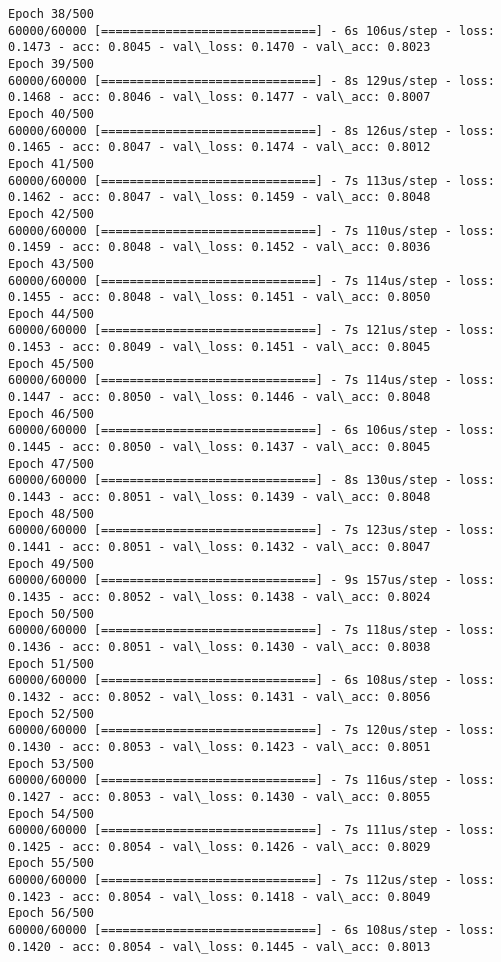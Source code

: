 \documentclass[11pt]{article}
\begin{document}
\begin{Verbatim}[commandchars=\\\{\}]
Epoch 38/500
60000/60000 [==============================] - 6s 106us/step - loss: 0.1473 - acc: 0.8045 - val\_loss: 0.1470 - val\_acc: 0.8023
Epoch 39/500
60000/60000 [==============================] - 8s 129us/step - loss: 0.1468 - acc: 0.8046 - val\_loss: 0.1477 - val\_acc: 0.8007
Epoch 40/500
60000/60000 [==============================] - 8s 126us/step - loss: 0.1465 - acc: 0.8047 - val\_loss: 0.1474 - val\_acc: 0.8012
Epoch 41/500
60000/60000 [==============================] - 7s 113us/step - loss: 0.1462 - acc: 0.8047 - val\_loss: 0.1459 - val\_acc: 0.8048
Epoch 42/500
60000/60000 [==============================] - 7s 110us/step - loss: 0.1459 - acc: 0.8048 - val\_loss: 0.1452 - val\_acc: 0.8036
Epoch 43/500
60000/60000 [==============================] - 7s 114us/step - loss: 0.1455 - acc: 0.8048 - val\_loss: 0.1451 - val\_acc: 0.8050
Epoch 44/500
60000/60000 [==============================] - 7s 121us/step - loss: 0.1453 - acc: 0.8049 - val\_loss: 0.1451 - val\_acc: 0.8045
Epoch 45/500
60000/60000 [==============================] - 7s 114us/step - loss: 0.1447 - acc: 0.8050 - val\_loss: 0.1446 - val\_acc: 0.8048
Epoch 46/500
60000/60000 [==============================] - 6s 106us/step - loss: 0.1445 - acc: 0.8050 - val\_loss: 0.1437 - val\_acc: 0.8045
Epoch 47/500
60000/60000 [==============================] - 8s 130us/step - loss: 0.1443 - acc: 0.8051 - val\_loss: 0.1439 - val\_acc: 0.8048
Epoch 48/500
60000/60000 [==============================] - 7s 123us/step - loss: 0.1441 - acc: 0.8051 - val\_loss: 0.1432 - val\_acc: 0.8047
Epoch 49/500
60000/60000 [==============================] - 9s 157us/step - loss: 0.1435 - acc: 0.8052 - val\_loss: 0.1438 - val\_acc: 0.8024
Epoch 50/500
60000/60000 [==============================] - 7s 118us/step - loss: 0.1436 - acc: 0.8051 - val\_loss: 0.1430 - val\_acc: 0.8038
Epoch 51/500
60000/60000 [==============================] - 6s 108us/step - loss: 0.1432 - acc: 0.8052 - val\_loss: 0.1431 - val\_acc: 0.8056
Epoch 52/500
60000/60000 [==============================] - 7s 120us/step - loss: 0.1430 - acc: 0.8053 - val\_loss: 0.1423 - val\_acc: 0.8051
Epoch 53/500
60000/60000 [==============================] - 7s 116us/step - loss: 0.1427 - acc: 0.8053 - val\_loss: 0.1430 - val\_acc: 0.8055
Epoch 54/500
60000/60000 [==============================] - 7s 111us/step - loss: 0.1425 - acc: 0.8054 - val\_loss: 0.1426 - val\_acc: 0.8029
Epoch 55/500
60000/60000 [==============================] - 7s 112us/step - loss: 0.1423 - acc: 0.8054 - val\_loss: 0.1418 - val\_acc: 0.8049
Epoch 56/500
60000/60000 [==============================] - 6s 108us/step - loss: 0.1420 - acc: 0.8054 - val\_loss: 0.1445 - val\_acc: 0.8013

\end{Verbatim}
\end{document}
